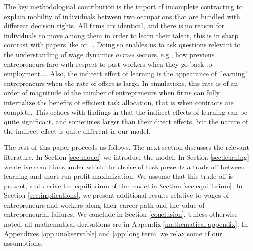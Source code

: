 \documentclass[12pt,american]{paper}
\theoremstyle{remark}
\begin{document}

The key methodological contribution is the import of incomplete contracting to explain mobility of individuals between two occupations that are bundled with different decision rights. All firms are identical, and there is no reason for individuals to move among them in order to learn their talent, this is in sharp contrast with papers like \cite{papageorgiou_learning_2010} or \cite{pastorino2013careers}... Doing so enables us to ask questions relevant to the understanding of wage dynamics \textit{across} sectors, e.g., how previous entrepreneurs fare with respect to past workers when they go back to employment.... Also, the indirect effect of learning is the appearance of `learning' entrepreneurs when the rate of offers is large. In simulations, this rate is of an  order of magnitude of the number of entrepreneurs when firms can fully internalize the benefits of efficient task allocation, that is when contracts are complete. This echoes with findings in \cite{pastorino2013careers} that the indirect effects of learning can be quite significant, and sometimes larger than their direct effects, but the nature of the indirect effect is quite different in our model.


The rest of this paper proceeds as follows. The next section discusses the relevant literature.
In Section \ref{sec:model} we introduce the model. In Section \ref{sec:learning} we derive conditions under which the choice of task presents a trade off between learning and short-run profit maximization. We assume that this trade off is present, and derive the equilibrium of the model in Section \ref{sec:equilibrium}.  In Section \ref{sec:implications}, we present additional results relative to wages of entrepreneurs and workers along their career path and the value of entrepreneurial failures. We conclude in Section \ref{conclusion}. Unless otherwise noted, all mathematical derivations are in Appendix \ref{mathematical appendix}. In  Appendixes \ref{app:unobservable} and \ref{app:long term} we relax some of our assumptions. 
\end{document}
